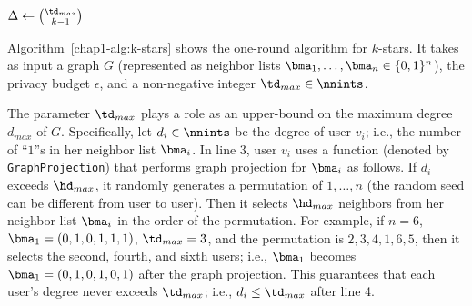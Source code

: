 \begin{algorithm}
  \SetAlgoLined
  $\Delta \leftarrow \binom{\td_{max}}{k-1}$\;
  \caption{\label{chap1-alg:k-stars}}
\end{algorithm}

Algorithm~\ref{chap1-alg:k-stars} shows the one-round algorithm for $k$-stars. 
It takes as input a graph $G$ (represented as neighbor lists $\bma_1, \ldots, \bma_n \in \{0,1\}^n$), the privacy budget $\epsilon$, and a non-negative integer $\td_{max} \in \nnints$. 

The parameter $\td_{max}$ plays a role as an upper-bound on the maximum degree $d_{max}$ of $G$. 
Specifically, let $d_i \in \nnints$ be the degree of user $v_i$; i.e., the number of ``$1$''s in her neighbor list $\bma_i$. 
In line 3, user $v_i$
uses a function (denoted by \texttt{GraphProjection}) that performs graph projection \cite{Day_SIGMOD16,Kasiviswanathan_TCC13,Raskhodnikova_arXiv15} for $\bma_i$ as follows. 
If $d_i$ exceeds $\hd_{max}$, it randomly generates a permutation of $1,\ldots,n$ (the random seed can be different from user to user). 
Then it selects $\hd_{max}$ neighbors from her neighbor list $\bma_i$ in the order of the permutation.
For example, if $n=6$, $\bma_1=(0,1,0,1,1,1)$, $\td_{max}=3$, and the permutation is $2,3,4,1,6,5$, then 
it selects the second, fourth, and sixth users; i.e., $\bma_1$ becomes $\bma_1=(0,1,0,1,0,1)$ after the graph projection. 
This guarantees that each user's degree never exceeds $\td_{max}$; i.e., $d_i \leq \td_{max}$ after line 4. 

